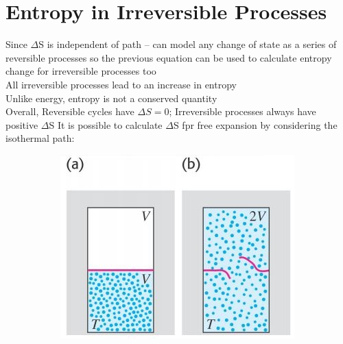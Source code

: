 \documentclass[a4paper, 11pt, normalem]{report}
\begin{document}
\section{Entropy in Irreversible Processes}
Since $\Delta$S is independent of path -- can model any change of state as a series of reversible processes so the previous equation can be used to calculate entropy change for irreversible processes too \\
All irreversible processes lead to an increase in entropy \\
Unlike energy, entropy is not a conserved quantity \\
Overall, Reversible cycles have ${\Delta}S = 0$; Irreversible processes always have positive $\Delta$S
It is possible to calculate $\Delta$S fpr free expansion by considering the isothermal path:
\begin{figure}[H]
	\begin{subfigure}{0.4\textwidth}
		\includegraphics[width=\textwidth]{Entropy1.jpg}
	\end{subfigure}
	\begin{subfigure}{0.3\textwidth}

\end{subfigure}
\end{figure}
\end{document}

